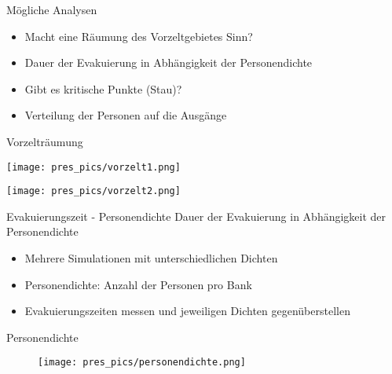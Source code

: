 


\begin{frame}{Mögliche Analysen}
\begin{itemize}
\item Macht eine Räumung des Vorzeltgebietes Sinn?
\item Dauer der Evakuierung in Abhängigkeit der Personendichte
\item Gibt es kritische Punkte (Stau)?
\item Verteilung der Personen auf die Ausgänge
\end{itemize}
\end{frame}


\begin{frame}{Vorzelträumung}


	\begin{minipage}{0.48\textwidth}
		\texttt{[image: pres\_pics/vorzelt1.png]}\\

	\end{minipage} \hfill
	\begin{minipage}{0.48\textwidth}
		\texttt{[image: pres\_pics/vorzelt2.png]}\\

\end{minipage}

\end{frame}


\begin{frame}{Evakuierungszeit - Personendichte}
Dauer der Evakuierung in Abhängigkeit der Personendichte
\begin{itemize}
	\item Mehrere Simulationen mit unterschiedlichen Dichten
	\item Personendichte: Anzahl der Personen pro Bank
	\item Evakuierungszeiten messen und jeweiligen Dichten gegenüberstellen
	\end{itemize}
\end{frame}


\begin{frame}{Personendichte}

	\begin{figure}
		\texttt{[image: pres\_pics/personendichte.png]}\\

	\end{figure}

\end{frame}

